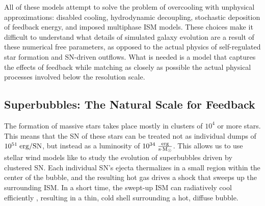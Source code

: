 All of these models attempt to solve the problem of overcooling with unphysical
approximations: disabled cooling, hydrodynamic decoupling, stochastic deposition
of feedback energy, and imposed multiphase ISM models.  These choices make it
difficult to understand what details of simulated galaxy evolution are a result
of these numerical free parameters, as opposed to the actual physics of
self-regulated star formation and SN-driven outflows.  What is needed is a model that
captures the effects of feedback while matching as closely as possible the
actual physical processes involved below the resolution scale.

\subsection{Superbubbles: The Natural Scale for Feedback}
The formation of massive stars takes place mostly in clusters of $10^4$ or more
stars.  This means that the SN of these stars can be treated not as
individual dumps of $10^{51}\;\rm{erg/SN}$, but instead as a luminosity of
$10^{34}\;\rm{\frac{erg}{s \cdot M_\odot}}$.  This allows us to use stellar wind
models like \citet{Weaver1977} to study the evolution of superbubbles driven by
clustered SN.  Each individual SN's ejecta thermalizes in a small
region within the center of the bubble, and the resulting hot gas drives a shock
that sweeps up the surrounding ISM.  In a short time, the swept-up ISM can
radiatively cool efficiently , resulting in a thin, cold shell surrounding a
hot, diffuse bubble.

